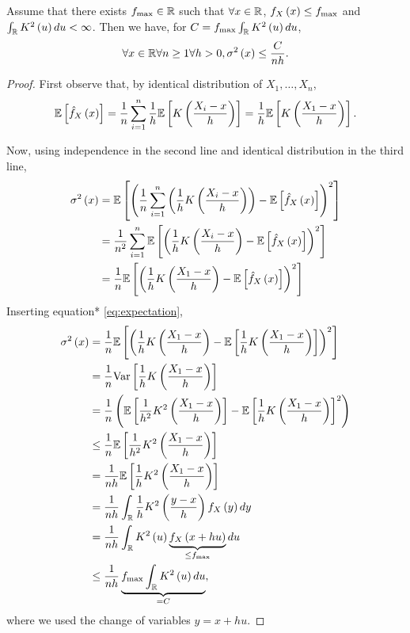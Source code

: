 \begin{proposition}\label{prop:1}
  Assume that there exists $f_{\max}\in \mathbb{R}$ such that $\forall x\in \mathbb{R}$, $f_X\left(x\right)\leq f_{\max}$ and $\int_{\mathbb{R}} K^2\left(u\right)du <\infty$. Then we have, for $C= f_{\max}\int_{\mathbb{R}} K^2\left(u\right)du$,
  \begin{equation*}
    \forall x\in\mathbb{R}\forall n\geq 1 \forall h>0, \sigma^2\left(x\right)\leq \frac{C}{nh}.
  \end{equation*}
\end{proposition}
\begin{proof}
  First observe that, by identical distribution of $X_1,\ldots, X_n$,
  \begin{equation*}\label{eq:expectation}
    \mathbb{E}\left[\hat{f}_X\left(x\right)\right] = \frac{1}{n}\sum_{i=1}^n \frac{1}{h}\mathbb{E}\left[K\left(\frac{X_i-x}{h}\right)\right] = \frac{1}{h}\mathbb{E}\left[K\left(\frac{X_1-x}{h}\right)\right].
  \end{equation*}

  Now, using independence in the second line and identical distribution in the third line,
  \begin{equation*}
  \begin{split}
    \sigma^2\left(x\right) &= \mathbb{E}\left[\left(\frac{1}{n} \sum_{i=1}^n \left(\frac{1}{h} K\left(\frac{X_i-x}{h}\right)\right) - \mathbb{E}\left[\hat{f}_X \left(x\right)\right]\right)^2\right] \\
    &=\frac{1}{n^2} \sum_{i=1}^n\mathbb{E}\left[ \left(\frac{1}{h} K\left(\frac{X_i-x}{h}\right) - \mathbb{E}\left[\hat{f}_X \left(x\right)\right]\right)^2\right]\\
    &= \frac{1}{n} \mathbb{E}\left[\left( \frac{1}{h} K\left(\frac{X_1-x}{h}\right)- \mathbb{E}\left[\hat{f}_X \left(x\right)\right]\right)^2\right]
      \end{split}
  \end{equation*}
  Inserting equation* \ref{eq:expectation},
  \begin{equation*}
    \begin{split}
      \sigma^2\left(x\right) &= \frac{1}{n} \mathbb{E}\left[\left( \frac{1}{h} K\left(\frac{X_1-x}{h}\right) - \mathbb{E}\left[\frac{1}{h} K\left(\frac{X_1-x}{h}\right)\right]\right)^2\right]\\
      &= \frac{1}{n}\mathrm{Var}\left[\frac{1}{h} K\left(\frac{X_1-x}{h}\right)\right] \\
      &= \frac{1}{n}\left( \mathbb{E}\left[\frac{1}{h^2} K^2\left(\frac{X_1-x}{h}\right) \right] - \mathbb{E}\left[\frac{1}{h} K\left(\frac{X_1-x}{h}\right)\right]^2\right) \\
      &\leq \frac{1}{n} \mathbb{E}\left[\frac{1}{h^2} K^2\left(\frac{X_1-x}{h}\right) \right]\\
      &=\frac{1}{nh} \mathbb{E}\left[\frac{1}{h} K^2\left(\frac{X_1-x}{h}\right) \right] \\
      &=\frac{1}{nh} \int_{\mathbb{R}} \frac{1}{h} K^2\left(\frac{y-x}{h}\right) f_X\left(y\right)dy\\
      &= \frac{1}{nh} \int_{\mathbb{R}} K^2\left(u\right) \underbrace{f_X\left(x+h u\right)}_{\leq f_{\max}} du \\
      &\leq \frac{1}{nh} \underbrace{f_{\max} \int_{\mathbb{R}} K^2\left(u\right) du}_{=C},
    \end{split}
  \end{equation*}
  where we used the change of variables $y=x+hu$.
\end{proof}

